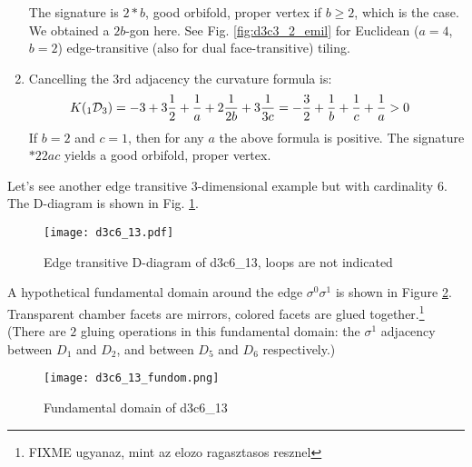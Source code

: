 \documentclass[12pt,a4paper]{article}
\numberwithin{equation}{section}
\newcommand{\leftsub}[2]{{\vphantom{#2}}_{#1}{#2}}
\theoremstyle{plain}%
\theoremstyle{definition}
\theoremstyle{remark}
\begin{document}
\begin{enumerate}
    The signature is $2*b$, good orbifold, proper vertex if $b\geq2$, which is
    the case. We obtained a $2b$-gon here. See Fig. \ref{fig:d3c3_2_emil} for
    Euclidean ($a=4$, $b=2$) edge-transitive (also for dual face-transitive)
    tiling.
  \item Cancelling the $3$rd adjacency the curvature formula is:
    \begin{align*}
      K(\leftsub{1}{\mathcal{D}}_3)&= -3 + 3\frac{1}{2} + \frac{1}{a} +
      2\frac{1}{2b} + 3\frac{1}{3c} =
       -\frac{3}{2} + \frac{1}{b} + \frac{1}{c} + \frac{1}{a} > 0
    \end{align*}
    If $b=2$ and $c=1$, then for any $a$ the above formula is positive.
    The signature $*22ac$ yields a good orbifold, proper vertex.
\end{enumerate}







Let's see another edge transitive $3$-dimensional example but with cardinality $6$. The
D-diagram is shown in Fig.
\ref{fig:d3c6_13}.

\begin{figure}
  \caption{\label{fig:d3c6_13} Edge transitive D-diagram of d3c6\_13, loops are not indicated}
  \center
  \texttt{[image: d3c6\_13.pdf]}
\end{figure}

A hypothetical fundamental domain around the edge $\sigma^0\sigma^1$ is shown in
Figure \ref{fig:d3c6_13_fundom}.
Transparent chamber facets are mirrors, colored facets are glued
together.\footnote{FIXME ugyanaz, mint az elozo ragasztasos resznel}
(There are $2$ gluing operations in this fundamental domain: the $\sigma^1$ adjacency between
$D_1$ and $D_2$, and between $D_5$ and $D_6$ respectively.)

\begin{figure}
  \caption{\label{fig:d3c6_13_fundom} Fundamental domain of d3c6\_13}
  \center
  \texttt{[image: d3c6\_13\_fundom.png]}
\end{figure}
\end{document}
